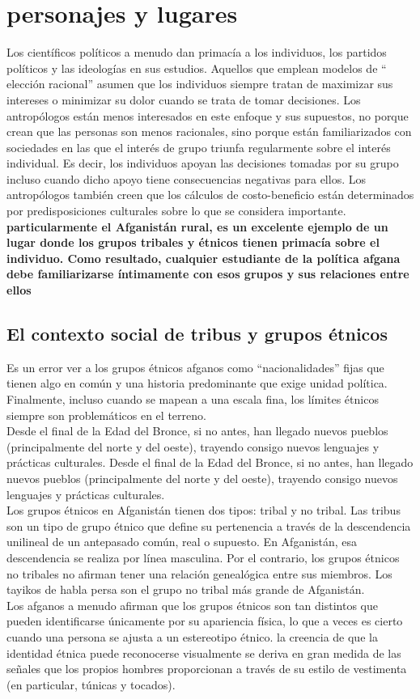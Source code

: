 \documentclass[10pt]{book}
\begin{document}
\chapter{personajes y lugares}
Los científicos políticos a menudo dan primacía a los individuos, los partidos políticos y las ideologías en sus estudios. Aquellos que emplean modelos de $“$elección racional$”$ asumen que los individuos siempre tratan de maximizar sus intereses o minimizar su dolor cuando se trata de tomar decisiones. Los antropólogos están menos interesados ​​en este enfoque y sus supuestos, no porque crean que las personas son menos racionales, sino porque están familiarizados con sociedades en las que el interés de grupo triunfa regularmente sobre el interés individual. Es decir, los individuos apoyan las decisiones tomadas por su grupo incluso cuando dicho apoyo tiene consecuencias negativas para ellos. Los antropólogos también creen que los cálculos de costo-beneficio están determinados por predisposiciones culturales sobre lo que se considera importante.\\
\textbf{particularmente el Afganistán rural, es un excelente ejemplo de un lugar donde los grupos tribales y étnicos tienen primacía sobre el individuo. Como resultado, cualquier estudiante de la política afgana debe familiarizarse íntimamente con esos grupos y sus relaciones entre ellos}
\section{El contexto social de tribus y grupos étnicos}
Es un error ver a los grupos étnicos afganos como “nacionalidades” fijas que tienen algo en común y una historia predominante que exige unidad política. Finalmente, incluso cuando se mapean a una escala fina, los límites étnicos siempre son problemáticos en el terreno. \\
Desde el final de la Edad del Bronce, si no antes, han llegado nuevos pueblos (principalmente del norte y del oeste), trayendo consigo nuevos lenguajes y prácticas culturales. Desde el final de la Edad del Bronce, si no antes, han llegado nuevos pueblos (principalmente del norte y del oeste), trayendo consigo nuevos lenguajes y prácticas culturales.\\
Los grupos étnicos en Afganistán tienen dos tipos: tribal y no tribal. Las tribus son un tipo de grupo étnico que define su pertenencia a través de la descendencia unilineal de un antepasado común, real o supuesto. En Afganistán, esa descendencia se realiza por línea masculina. Por el contrario, los grupos étnicos no tribales no afirman tener una relación genealógica entre sus miembros. Los tayikos de habla persa son el grupo no tribal más grande de Afganistán.\\
Los afganos a menudo afirman que los grupos étnicos son tan distintos que pueden identificarse únicamente por su apariencia física, lo que a veces es cierto cuando una persona se ajusta a un estereotipo étnico. la creencia de que la identidad étnica puede reconocerse visualmente se deriva en gran medida de las señales que los propios hombres proporcionan a través de su estilo de vestimenta (en particular, túnicas y tocados).
\end{document}
